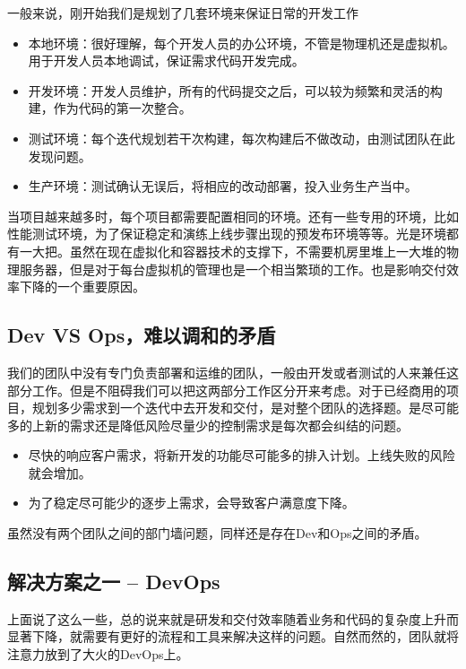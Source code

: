 \documentclass[12pt]{article}
\begin{document}
一般来说，刚开始我们是规划了几套环境来保证日常的开发工作
\begin{itemize}
\setlength{\itemsep}{0pt}
\setlength{\parsep}{0pt}
\setlength{\parskip}{0pt}
    \item 本地环境：很好理解，每个开发人员的办公环境，不管是物理机还是虚拟机。用于开发人员本地调试，保证需求代码开发完成。

    \item 开发环境：开发人员维护，所有的代码提交之后，可以较为频繁和灵活的构建，作为代码的第一次整合。
    
    \item 测试环境：每个迭代规划若干次构建，每次构建后不做改动，由测试团队在此发现问题。
    
   \item 生产环境：测试确认无误后，将相应的改动部署，投入业务生产当中。
\end{itemize}

当项目越来越多时，每个项目都需要配置相同的环境。还有一些专用的环境，比如性能测试环境，为了保证稳定和演练上线步骤出现的预发布环境等等。光是环境都有一大把。虽然在现在虚拟化和容器技术的支撑下，不需要机房里堆上一大堆的物理服务器，但是对于每台虚拟机的管理也是一个相当繁琐的工作。也是影响交付效率下降的一个重要原因。

\subsection{Dev VS Ops，难以调和的矛盾}
我们的团队中没有专门负责部署和运维的团队，一般由开发或者测试的人来兼任这部分工作。但是不阻碍我们可以把这两部分工作区分开来考虑。对于已经商用的项目，规划多少需求到一个迭代中去开发和交付，是对整个团队的选择题。是尽可能多的上新的需求还是降低风险尽量少的控制需求是每次都会纠结的问题。

\begin{itemize}
\setlength{\itemsep}{0pt}
\setlength{\parsep}{0pt}
\setlength{\parskip}{0pt}
    \item 尽快的响应客户需求，将新开发的功能尽可能多的排入计划。上线失败的风险就会增加。

    \item 为了稳定尽可能少的逐步上需求，会导致客户满意度下降。
\end{itemize}

虽然没有两个团队之间的部门墙问题，同样还是存在Dev和Ops之间的矛盾。

\subsection{解决方案之一 -- DevOps}
上面说了这么一些，总的说来就是研发和交付效率随着业务和代码的复杂度上升而显著下降，就需要有更好的流程和工具来解决这样的问题。自然而然的，团队就将注意力放到了大火的DevOps上。
\end{document}
